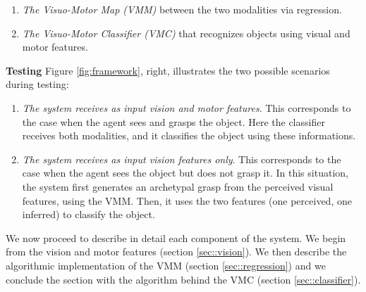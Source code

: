 \begin{enumerate}
 \item[] \textit{The Visuo-Motor Map (VMM)} between the two modalities via regression.
 \item[] \textit{The Visuo-Motor Classifier (VMC)} that recognizes objects using visual and motor features.
\end{enumerate}

%

\vspace{0.5cm}
\noindent
{\bf Testing} Figure \ref{fig:framework}, right, illustrates the two possible scenarios during testing:
\begin{enumerate}
\item[]\textit{The system receives as input vision and motor features}. This corresponds to the case when the agent sees and grasps the object. Here the classifier receives both modalities, and it classifies the object using these informations.
\item[]\textit{The system receives as input vision features only}. This corresponds to the case when the agent sees the object but
does not grasp it. In this situation, the system first generates an archetypal grasp from the perceived visual features, using the VMM.
Then, it uses the two features (one perceived, one inferred) to classify the object.
\end{enumerate}

We now proceed to describe in detail each component of the system. We begin from the vision and motor features (section \ref{sec::vision}). We 
then describe the algorithmic implementation of the VMM (section \ref{sec::regression}) and we conclude the section with the 
algorithm behind the VMC (section \ref{sec::classifier}).

